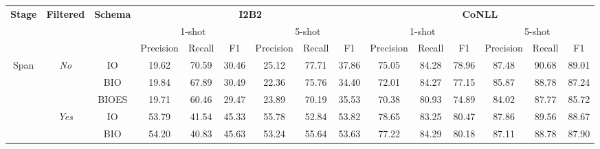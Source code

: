 \documentclass[11pt]{article}
\begin{document}
\begin{table*}[htb]
    \centering
    \small
    \setlength{\tabcolsep}{1.2mm}
    \resizebox{\textwidth}{!}
    {
        \begin{tabular}{ccccccccccccccc}
        \toprule
        \multirow{3}{*}{\textbf{Stage}} & \multirow{3}{*}{\textbf{Filtered}}             & \multirow{3}{*}{\textbf{Schema}} & \multicolumn{6}{c}{\textbf{I2B2}}                             & \multicolumn{6}{c}{\textbf{CoNLL}}                            \\
        \cmidrule(lr){4-9} \cmidrule(lr){10-15} 
                                        &                                                &                                  & \multicolumn{3}{c}{1-shot}    & \multicolumn{3}{c}{5-shot}    & \multicolumn{3}{c}{1-shot}    & \multicolumn{3}{c}{5-shot}    \\
        \cmidrule(lr){4-6} \cmidrule(lr){7-9} \cmidrule(lr){10-12} \cmidrule(lr){13-15} 
                                        &                                                &                                  & Precision & Recall  & F1      & Precision & Recall  & F1      & Precision & Recall  & F1      & Precision & Recall  & F1      \\
        \cmidrule(lr){1-3} \cmidrule(lr){4-9} \cmidrule(lr){10-15} 
        \multirow{6}{*}{Span}           & \multirow{3}{*}{\textit{No}}  & IO                                                & 19.62   & 70.59 & 30.46 & 25.12   & 77.71 & 37.86 & 75.05   & 84.28 & 78.96 & 87.48   & 90.68 & 89.01 \\
                                        &                                                & BIO                              & 19.84   & 67.89 & 30.49 & 22.36   & 75.76 & 34.40 & 72.01   & 84.27 & 77.15 & 85.87   & 88.78 & 87.24 \\
                                        &                                                & BIOES                            & 19.71   & 60.46 & 29.47 & 23.89   & 70.19 & 35.53 & 70.38   & 80.93 & 74.89 & 84.02   & 87.77 & 85.72 \\
        \cmidrule(lr){2-2} \cmidrule(lr){3-3} \cmidrule(lr){4-9} \cmidrule(lr){10-15}
                                        & \multirow{3}{*}{\textit{Yes}} & IO                                                & 53.79   & 41.54 & 45.33 & 55.78   & 52.84 & 53.82 & 78.65   & 83.25 & 80.47 & 87.86   & 89.56 & 88.67 \\
                                        &                                                & BIO                              & 54.20   & 40.83 & 45.63 & 53.24   & 55.64 & 53.63 & 77.22   & 84.29 & 80.18 & 87.11   & 88.78 & 87.90 \\

\end{tabular}}
\end{table*}
\end{document}
